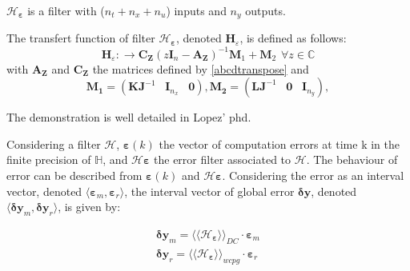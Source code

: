 		$\mathcal{H}_{\boldsymbol{\varepsilon}}$ is a filter with ($n_t+n_x+n_u$) inputs and $n_y$ outputs.
		\begin{proposition}
			The transfert function of filter $\mathcal{H_{\boldsymbol{\varepsilon}}}$, denoted $\boldsymbol{H}_\varepsilon$, is defined as follows:
			\begin{equation}
				\boldsymbol{H}_{\varepsilon}: \rightarrow \boldsymbol{C_Z}(z\boldsymbol{I}_n-\boldsymbol{A_Z})^{-1}\boldsymbol{M}_1 +\boldsymbol{M}_2 \hspace{5pt} \forall z \in \mathbb{C}
			\end{equation}
			with $\boldsymbol{A_Z}$ and $\boldsymbol{C_Z}$ the matrices defined by \ref{abcdtranspose} and
			\begin{equation}
				\boldsymbol{M_1}=(\boldsymbol{KJ}^{-1}   \hspace{10pt}\boldsymbol{I}_{n_x} \hspace{10pt} \boldsymbol{0}), 
				\boldsymbol{M_2}=(\boldsymbol{LJ}^{-1}  \hspace{10pt}\boldsymbol{0} \hspace{10pt}\boldsymbol{I}_{n_y}), 
			\end{equation}
		\end{proposition}
		The demonstration is well detailed in Lopez' phd.

		\begin{corollary} \label{corimp}
			Considering a filter $\mathcal{H}$, $\boldsymbol{\varepsilon}(k)$ the vector of computation errors at time k in the finite precision of $\mathbb{H}$,
			and $\mathcal{H}\boldsymbol{\varepsilon}$ the error filter associated to $\mathcal{H}$.
			The behaviour of error can be described from $\boldsymbol{\varepsilon}(k)$ and $\mathcal{H}\boldsymbol{\varepsilon}$.
			Considering the error as an interval vector, denoted $\langle \boldsymbol{\varepsilon}_m, \boldsymbol{\varepsilon}_r \rangle$,
			the interval vector of global error $\boldsymbol{\delta y}$, denoted $\langle \boldsymbol{\delta y}_m, \boldsymbol{\delta y}_r \rangle$, is given by:
		\end{corollary}

		\begin{eqnarray} \label{eqprec}
			\boldsymbol{\delta y}_m = \langle\langle \mathcal{H}_{\boldsymbol{\varepsilon}} \rangle\rangle_{DC} \cdot \boldsymbol{\varepsilon}_m \\
			\boldsymbol{\delta y}_r = \langle\langle \mathcal{H}_{\boldsymbol{\varepsilon}} \rangle\rangle_{wcpg} \cdot \boldsymbol{\varepsilon}_r
		\end{eqnarray}

